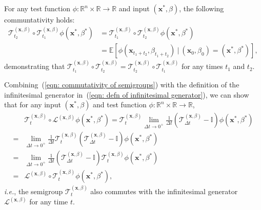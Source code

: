 \documentclass{article}
\numberwithin{equation}{section}
\def\eqref#1{(\ref{#1})}
\def\vx{{\bm{x}}}
\def\gT{{\mathcal{T}}}
\def\sI{{\mathbb{I}}}
\newcommand{\Ls}{\mathcal{L}}
\begin{document}
For any test function $\phi:\mathbb{R}^n \times \mathbb{R} \rightarrow \mathbb{R}$ and input $(\vx^\ast,\beta)$, the following communtativity holds:
\begin{equation}
    \label{eqn: commutativity of semigroups}
    \begin{aligned}
    \gT^{(\vx,\beta)}_{t_2}\circ \gT^{(\vx,\beta)}_{t_1}\phi(\vx^\ast,\beta^\ast) &= \gT^{(\vx,\beta)}_{t_1}\circ\gT^{(\vx,\beta)}_{t_2}\phi(\vx^\ast,\beta^\ast) \\
    &= \mathbb{E}\left[\phi(\vx_{t_1+t_2},\beta_{t_1+t_2}) \ | \ (\vx_0,\beta_0) = (\vx^\ast, \beta^\ast)\right],   
    \end{aligned}    
\end{equation}
demonstrating that $\gT^{(\vx,\beta)}_{t_1} \circ \gT^{(\vx,\beta)}_{t_2} = \gT^{(\vx,\beta)}_{t_2} \circ \gT^{(\vx,\beta)}_{t_1}$ for any times $t_1$ and $t_2$. 

Combining~\eqref{eqn: commutativity of semigroups} with the definition of the infinitesimal generator in~\eqref{eqn: defn of infinitesimal generator}, we can show that for any input $(\vx^\ast,\beta)$ and test function $\phi:\mathbb{R}^n \times \mathbb{R} \rightarrow \mathbb{R}$,
\begin{equation}
    \label{eqn: commutativity of semigroup and infinitesimal generator}
    \begin{aligned}
    &\gT^{(\vx,\beta)}_{t}\circ \Ls^{(\vx,\beta)}\phi \left(\vx^\ast,\beta^\ast\right) = \gT^{(\vx,\beta)}_{t}\lim_{\Delta t \rightarrow 0^{+}}\frac{1}{\Delta t}\left(\gT^{(\vx,\beta)}_{\Delta t}-\sI\right)\phi(\vx^\ast,\beta^\ast) \\
    =& \lim_{\Delta t \rightarrow 0^{+}}\frac{1}{\Delta t}\gT^{(\vx,\beta)}_{t}\left(\gT^{(\vx,\beta)}_{\Delta t}-\sI\right)\phi(\vx^\ast,\beta^\ast)\\
    =&\lim_{\Delta t \rightarrow 0^{+}}\frac{1}{\Delta t}\left(\gT^{(\vx,\beta)}_{\Delta t}-\sI\right)\gT^{(\vx,\beta)}_{t}\phi(\vx^\ast,\beta^\ast) \\
    =& \Ls^{(\vx,\beta)}\circ\gT^{(\vx,\beta)}_{t}\phi\left(\vx^\ast,\beta^\ast\right),
    \end{aligned}    
\end{equation}
\emph{i.e.}, the semigroup $\gT^{(\vx,\beta)}_{t}$ also commutes with the infinitesimal generator $\Ls^{(\vx,\beta)}$ for any time $t$. 
\end{document}
